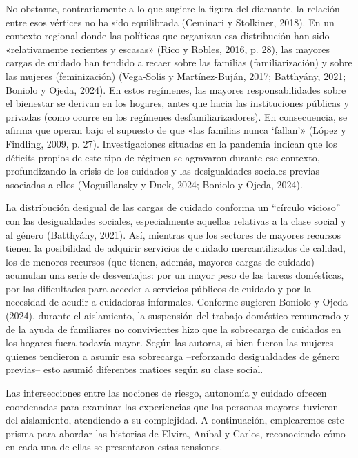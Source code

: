 No obstante, contrariamente a lo que sugiere la figura del diamante, la relación entre esos vértices no ha sido equilibrada (Ceminari y Stolkiner, 2018). En un contexto regional donde las políticas que organizan esa distribución han sido «relativamente recientes y escasas» (Rico y Robles, 2016, p. 28), las mayores cargas de cuidado han tendido a recaer sobre las familias (familiarización) y sobre las mujeres (feminización) (Vega-Solís y Martínez-Buján, 2017; Batthyány, 2021; Boniolo y Ojeda, 2024). En estos regímenes, las mayores responsabilidades sobre el bienestar se derivan en los hogares, antes que hacia las instituciones públicas y privadas (como ocurre en los regímenes desfamiliarizadores). En consecuencia, se afirma que operan bajo el supuesto de que «las familias nunca `fallan'» (López y Findling, 2009, p. 27). Investigaciones situadas en la pandemia indican que los déficits propios de este tipo de régimen se agravaron durante ese contexto, profundizando la crisis de los cuidados y las desigualdades sociales previas asociadas a ellos (Moguillansky y Duek, 2024; Boniolo y Ojeda, 2024).

La distribución desigual de las cargas de cuidado conforma un ``círculo vicioso'' con las desigualdades sociales, especialmente aquellas relativas a la clase social y al género (Batthyány, 2021). Así, mientras que los sectores de mayores recursos tienen la posibilidad de adquirir servicios de cuidado mercantilizados de calidad, los de menores recursos (que tienen, además, mayores cargas de cuidado) acumulan una serie de desventajas: por un mayor peso de las tareas domésticas, por las dificultades para acceder a servicios públicos de cuidado y por la necesidad de acudir a cuidadoras informales. Conforme sugieren Boniolo y Ojeda (2024), durante el aislamiento, la suspensión del trabajo doméstico remunerado y de la ayuda de familiares no convivientes hizo que la sobrecarga de cuidados en los hogares fuera todavía mayor. Según las autoras, si bien fueron las mujeres quienes tendieron a asumir esa sobrecarga --reforzando desigualdades de género previas-- esto asumió diferentes matices según su clase social.

Las intersecciones entre las nociones de riesgo, autonomía y cuidado ofrecen coordenadas para examinar las experiencias que las personas mayores tuvieron del aislamiento, atendiendo a su complejidad. A continuación, emplearemos este prisma para abordar las historias de Elvira, Aníbal y Carlos, reconociendo cómo en cada una de ellas se presentaron estas tensiones.

